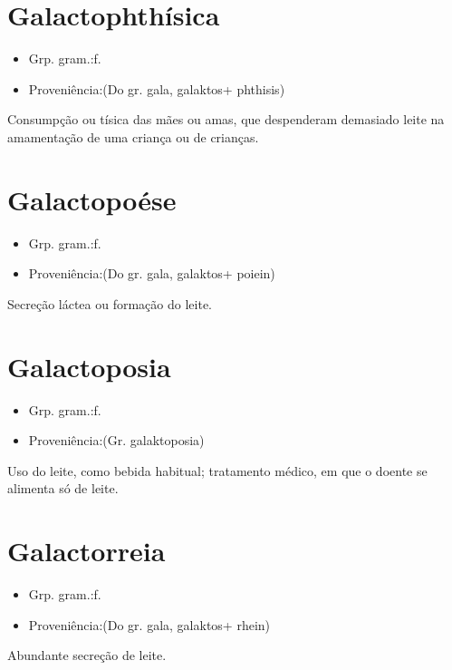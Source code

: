 \section{Galactophthísica}
\begin{itemize}
\item {Grp. gram.:f.}
\end{itemize}
\begin{itemize}
\item {Proveniência:(Do gr. \textunderscore gala\textunderscore , \textunderscore galaktos\textunderscore  + \textunderscore phthisis\textunderscore )}
\end{itemize}
Consumpção ou tísica das mães ou amas, que despenderam demasiado leite na amamentação de uma criança ou de crianças.
\section{Galactopoése}
\begin{itemize}
\item {Grp. gram.:f.}
\end{itemize}
\begin{itemize}
\item {Proveniência:(Do gr. \textunderscore gala\textunderscore , \textunderscore galaktos\textunderscore  + \textunderscore poiein\textunderscore )}
\end{itemize}
Secreção láctea ou formação do leite.
\section{Galactoposia}
\begin{itemize}
\item {Grp. gram.:f.}
\end{itemize}
\begin{itemize}
\item {Proveniência:(Gr. \textunderscore galaktoposia\textunderscore )}
\end{itemize}
Uso do leite, como bebida habitual; tratamento médico, em que o doente se alimenta só de leite.
\section{Galactorreia}
\begin{itemize}
\item {Grp. gram.:f.}
\end{itemize}
\begin{itemize}
\item {Proveniência:(Do gr. \textunderscore gala\textunderscore , \textunderscore galaktos\textunderscore  + \textunderscore rhein\textunderscore )}
\end{itemize}
Abundante secreção de leite.
